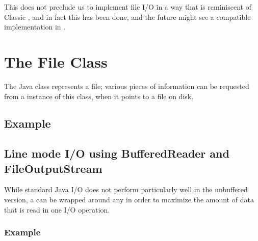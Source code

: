 {This does not preclude us to implement file I/O in a way that is
reminiscent of Classic \Rexx{}, and in fact this has been done, and
the future might see a compatible implementation in \nr{}.


  \section{The File Class}
  The Java  class represents a file; various pieces of
  information can be requested from a instance of this class, when it
  points to a file on disk.

  \subsection{Example}
  
  \subsection{Line mode I/O using BufferedReader and FileOutputStream}
  While standard Java I/O does not perform particularly well in the
  unbuffered version, a  can be wrapped around
  any  in order to maximize the amount of data that is
  read in one I/O operation.
  \subsubsection{Example}


}
